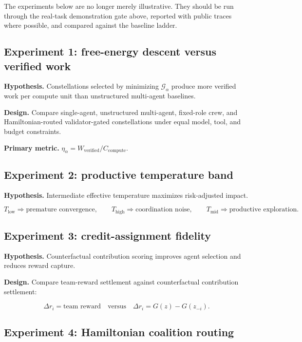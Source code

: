 \documentclass[11pt]{article}
\begin{document}
The experiments below are no longer merely illustrative. They should be run through the real-task demonstration gate above, reported with public traces where possible, and compared against the baseline ladder.

\subsection{Experiment 1: free-energy descent versus verified work}\label{experiment-1-free-energy-descent-versus-verified-work}

\textbf{Hypothesis.} Constellations selected by minimizing \(\mathcal{G}_{\alpha}\) produce more verified work per compute unit than unstructured multi-agent baselines.

\textbf{Design.} Compare single-agent, unstructured multi-agent, fixed-role crew, and Hamiltonian-routed validator-gated constellations under equal model, tool, and budget constraints.

\textbf{Primary metric.} \(\eta_{\alpha}=W_{\mathrm{verified}}/C_{\mathrm{compute}}\).

\subsection{Experiment 2: productive temperature band}\label{experiment-2-productive-temperature-band}

\textbf{Hypothesis.} Intermediate effective temperature maximizes risk-adjusted impact.

\[
T_{\mathrm{low}}\Rightarrow\text{premature convergence},
\qquad
T_{\mathrm{high}}\Rightarrow\text{coordination noise},
\qquad
T_{\mathrm{mid}}\Rightarrow\text{productive exploration}.
\]

\subsection{Experiment 3: credit-assignment fidelity}\label{experiment-3-credit-assignment-fidelity}

\textbf{Hypothesis.} Counterfactual contribution scoring improves agent selection and reduces reward capture.

\textbf{Design.} Compare team-reward settlement against counterfactual contribution settlement:

\[
\Delta r_i=\text{team reward}
\quad\text{versus}\quad
\Delta r_i=G(z)-G(z_{-i}).
\]

\subsection{Experiment 4: Hamiltonian coalition routing}\label{experiment-4-hamiltonian-coalition-routing}
\end{document}
